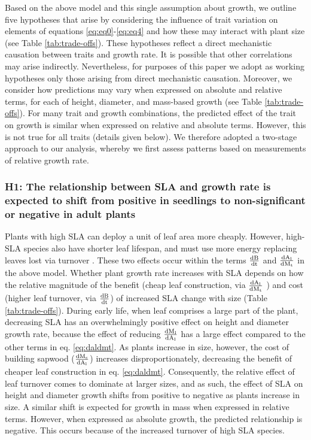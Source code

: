 \documentclass[a4paper,11pt]{article}
\begin{document}
Based on the above model and this single assumption about growth, we outline five hypotheses that arise by considering the influence of trait variation on elements of equations  \ref{eq:eq0}-\ref{eq:eq4} and how these may interact with plant size (see Table \ref{tab:trade-offs}). These hypotheses reflect a direct mechanistic causation between traits and growth rate. It is possible that other correlations may arise indirectly. Nevertheless, for purposes of this paper we adopt as working hypotheses only those arising from direct mechanistic causation. Moreover, we consider how predictions may vary when expressed on absolute and relative terms, for each of height, diameter, and mass-based growth (see Table \ref{tab:trade-offs}). For many trait and growth combinations, the predicted effect of the trait on growth is similar when expressed on relative and absolute terms. However, this is not true for all traits (details given below). We therefore adopted a two-stage approach to our analysis, whereby we first assess patterns based on measurements of relative growth rate.

\subsubsection*{H1: The relationship between SLA and growth rate is expected to shift from positive in seedlings to non-significant or negative in adult plants}

Plants with high SLA can deploy a unit of leaf area more cheaply. However, high-SLA species also have shorter leaf lifespan, and must use more energy replacing leaves lost via turnover \citep{Wright:2004jb}. These two effects occur within the terms  $\frac{\rm{d} B}{\rm{d} t}$ and $\frac{\rm{d} A_{\rm l}}{\rm{d} M_{\rm t}}$ in the above model. Whether plant growth rate increases with SLA depends on how the relative magnitude of the benefit (cheap leaf construction, via $\frac{\rm{d} A_{\rm l}}{\rm{d} M_{\rm t}}$ ) and cost (higher leaf turnover, via $\frac{\rm{d} B}{\rm{d} t}$) of increased SLA change with size (Table \ref{tab:trade-offs}). 
During early life, when leaf comprises a large part of the plant, decreasing SLA has an overwhelmingly positive effect on height and diameter growth rate, because the effect of reducing $\frac{\rm{d} M_{\rm l}}{\rm{d} A_{\rm l}}$ has a large effect compared to the other terms in eq. \ref{eq:daldmt}. As plants increase in size, however, the cost of building sapwood ($\frac{\rm{d} M_{\rm s}}{\rm{d} A_{\rm l}}$) increases disproportionately, decreasing the benefit of cheaper leaf construction in eq.  \ref{eq:daldmt}. Consequently, the relative effect of leaf turnover comes to dominate at larger sizes, and as such, the effect of SLA on height and diameter growth shifts from positive to negative as plants increase in size. A similar shift is expected for growth in mass when expressed in relative terms. However, when expressed as absolute growth, the predicted relationship is negative. This occurs because of the increased turnover of high SLA species.
\end{document}
